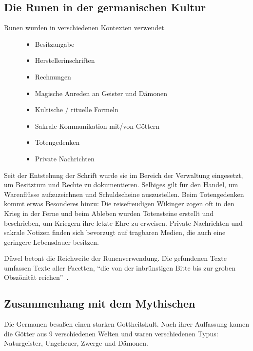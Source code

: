 \documentclass[a4paper]{scrartcl}
\begin{document}
\subsection{Die Runen in der germanischen Kultur}
%
Runen wurden in verschiedenen Kontexten verwendet.

\begin{figure}[!ht]
  \begin{minipage}{0.5\textwidth}
    \begin{itemize}
      \item Besitzangabe
      \item Herstellerinschriften
      \item Rechnungen
      \item Magische Anreden an Geister und Dämonen
    \end{itemize}
  \end{minipage}
  \begin{minipage}{0.5\textwidth}
    \begin{itemize}
      \item Kultische / rituelle Formeln
      \item Sakrale Kommunikation mit/von Göttern
      \item Totengedenken
      \item Private Nachrichten
    \end{itemize}
  \end{minipage}
\end{figure}

Seit der Entstehung der Schrift wurde sie im Bereich der Verwaltung eingesetzt, um Besitztum und Rechte zu dokumentieren. Selbiges gilt für den Handel, um Warenflüsse aufzuzeichnen und Schuldscheine auszustellen. Beim Totengedenken kommt etwas Besonderes hinzu: Die reisefreudigen Wikinger zogen oft in den Krieg in der Ferne und beim Ableben wurden Totensteine erstellt und beschrieben, um Kriegern ihre letzte Ehre zu erweisen. Private Nachrichten und sakrale Notizen finden sich bevorzugt auf tragbaren Medien, die auch eine geringere Lebensdauer besitzen.

Düwel betont die Reichweite der Runenverwendung. Die gefundenen Texte umfassen Texte aller Facetten, \enquote{die von der inbrünstigen Bitte bis zur groben Obszönität reichen}~\cite{düwel}.

\subsection{Zusammenhang mit dem Mythischen}
%
Die Germanen besaßen einen starken Gottheitskult. Nach ihrer Auffassung kamen die Götter aus 9 verschiedenen Welten und waren verschiedenen Typus: Naturgeister, Ungeheuer, Zwerge und Dämonen.
\end{document}
